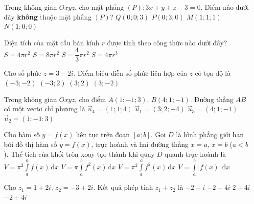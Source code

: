 \begin{ex}%
	Trong không gian $Oxyz$, cho mặt phẳng $(P)\colon 3x+y+z-3=0$. Điểm nào dưới đây \textbf{không} thuộc mặt phẳng $(P)$?
	\choice
	{$Q(0;0;3)$}
	{$P(0;3;0)$}
	{\True $M(1;1;1)$}
	{$N(1;0;0)$}
\end{ex}

\begin{ex}%
	Diện tích của mặt cầu bán kính $r$ được tính theo công thức nào dưới đây?
	\choice
	{\True $S=4\pi r^2$}
	{$S=8\pi r^2$}
	{$S=\dfrac{4}{3}\pi r^2$}
	{$S=4\pi r^3$}
\end{ex}

\begin{ex}%
	Cho số phức $z=3-2i$. Điểm biểu diễn số phức liên hợp của $z$ có tọa độ là
	\choice
	{$(-3;-2)$}
	{$(-3;2)$}
	{\True $(3;2)$}
	{$(3;-2)$}
\end{ex}

\begin{ex}%
	Trong không gian $Oxyz$, cho điểm $A(1;-1;3)$, $B(4;1;-1)$. Đường thẳng $AB$ có một vectơ chỉ phương là
	\choice
	{$\overrightarrow{u}_4=(1;1;4)$}
	{\True $\overrightarrow{u}_1=(3;2;-4)$}
	{$\overrightarrow{u}_3=(4;1;-1)$}
	{$\overrightarrow{u}_2=(1;-1;3)$}
\end{ex}

\begin{ex}%
	Cho hàm số $y=f(x)$ liên tục trên đoạn $[a;b]$. Gọi $D$ là hình phẳng giới hạn bởi đồ thị hàm số $y=f(x)$, trục hoành và hai đường thẳng $x=a$, $x=b$ ($a<b$). Thể tích của khối tròn xoay tạo thành khi quay $D$ quanh trục hoành là
	\choice
	{$V=\pi^2 \displaystyle\int\limits_a^b f(x) \mathrm{\,d}x$}
	{\True $V=\pi \displaystyle\int\limits_a^b f^2(x) \mathrm{\,d}x$}
	{$V=\pi^2\displaystyle\int\limits_a^b f^2(x) \mathrm{\,d}x$}
	{$V=\displaystyle\int\limits_a^b\big|f(x)\big|\mathrm{\,d}x$}
\end{ex}

\begin{ex}%
	Cho $z_1=1+2i$, $z_2=-3+2i$. Kết quả phép tính $z_1+z_2$ là
	\choice
	{$-2-i$}
	{$-2-4i$}
	{$2+4i$}
	{\True $-2+4i$}
\end{ex}

